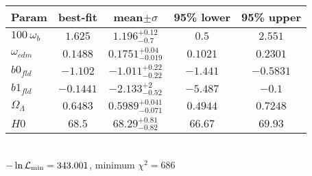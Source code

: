 \begin{tabular}{|l|c|c|c|c|} 
 \hline 
Param & best-fit & mean$\pm\sigma$ & 95\% lower & 95\% upper \\ \hline 
$100~\omega_{b }$ &$1.625$ & $1.196_{-0.7}^{+0.12}$ & $0.5$ & $2.551$ \\ 
$\omega_{cdm }$ &$0.1488$ & $0.1751_{-0.019}^{+0.04}$ & $0.1021$ & $0.2301$ \\ 
$b0_{fld }$ &$-1.102$ & $-1.011_{-0.22}^{+0.22}$ & $-1.441$ & $-0.5831$ \\ 
$b1_{fld }$ &$-0.1441$ & $-2.133_{-0.52}^{+2}$ & $-5.487$ & $-0.1$ \\ 
$\Omega_{\Lambda }$ &$0.6483$ & $0.5989_{-0.071}^{+0.041}$ & $0.4944$ & $0.7248$ \\ 
$H0$ &$68.5$ & $68.29_{-0.82}^{+0.81}$ & $66.67$ & $69.93$ \\ 
\hline 
 \end{tabular} \\ 
$-\ln{\cal L}_\mathrm{min} =343.001$, minimum $\chi^2=686$ \\ 
